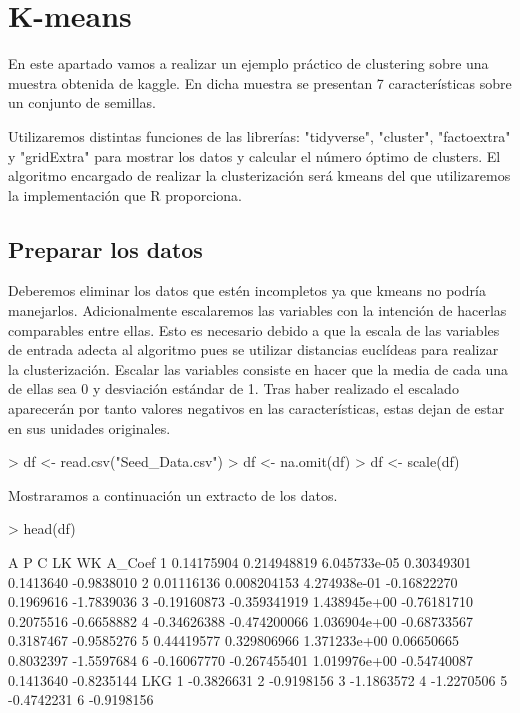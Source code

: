 \documentclass [a4paper] {article}
\begin{document}
\newpage
\section{K-means}
En este apartado vamos a realizar un ejemplo práctico de clustering sobre una muestra obtenida de kaggle.
En dicha muestra se presentan 7 características sobre un conjunto de semillas.

Utilizaremos distintas funciones de las librerías: "tidyverse", "cluster", "factoextra" y "gridExtra" para mostrar los datos y calcular el número óptimo de clusters.
El algoritmo encargado de realizar la clusterización será kmeans del que utilizaremos la implementación que R proporciona.

\subsection{Preparar los datos}
Deberemos eliminar los datos que estén incompletos ya que kmeans no podría manejarlos.
Adicionalmente escalaremos las variables con la intención de hacerlas comparables entre ellas.
Esto es necesario debido a que la escala de las variables de entrada adecta al algoritmo pues se utilizar distancias euclídeas para realizar la clusterización.
Escalar las variables consiste en hacer que la media de cada una de ellas sea 0 y desviación estándar de 1.
Tras haber realizado el escalado aparecerán por tanto valores negativos en las características, estas dejan de estar en sus unidades originales.
\begin{Schunk}
\begin{Sinput}
> df <- read.csv("Seed_Data.csv")
> df <- na.omit(df)
> df <- scale(df)
\end{Sinput}
\end{Schunk}
Mostraramos a continuación un extracto de los datos.
\begin{Schunk}
\begin{Sinput}
> head(df)
\end{Sinput}
\begin{Soutput}
            A            P            C          LK        WK     A_Coef
1  0.14175904  0.214948819 6.045733e-05  0.30349301 0.1413640 -0.9838010
2  0.01116136  0.008204153 4.274938e-01 -0.16822270 0.1969616 -1.7839036
3 -0.19160873 -0.359341919 1.438945e+00 -0.76181710 0.2075516 -0.6658882
4 -0.34626388 -0.474200066 1.036904e+00 -0.68733567 0.3187467 -0.9585276
5  0.44419577  0.329806966 1.371233e+00  0.06650665 0.8032397 -1.5597684
6 -0.16067770 -0.267455401 1.019976e+00 -0.54740087 0.1413640 -0.8235144
         LKG
1 -0.3826631
2 -0.9198156
3 -1.1863572
4 -1.2270506
5 -0.4742231
6 -0.9198156
\end{Soutput}
\end{Schunk}
\end{document}
